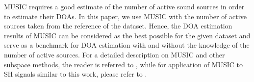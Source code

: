 \documentclass[journal]{IEEEtran}
\begin{document}
MUSIC requires a good estimate of the number of active sound sources in order to estimate their DOAs. In this paper, we use MUSIC with the number of active sources taken from the reference of the dataset. Hence, the DOA estimation results of MUSIC can be considered as the best possible for the given dataset and serve as a benchmark for DOA estimation with and without the knowledge of the number of active sources. For a detailed description on MUSIC and other subspace methods, the reader is referred to \cite{Ottersten1993}, while for application of MUSIC to SH signals similar to this work, please refer to \cite{khaykin2012acoustic}.

\end{document}
